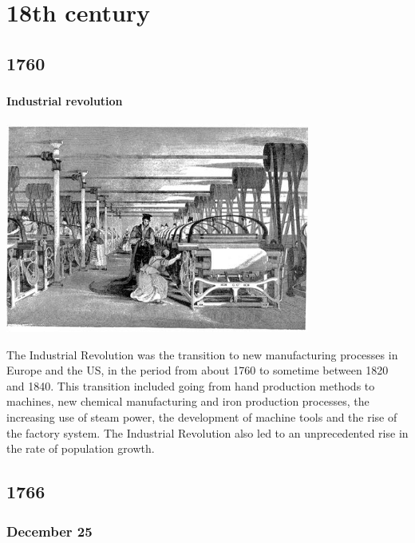 \documentclass[11pt]{report}
\begin{document}
							
\part{18th century}
\chapter{1760}
\section{}
\subsection{Industrial revolution}
\vspace{2mm}\begin{center}\includegraphics[width=10cm]{./img/industrevolution.jpg}\end{center}
The Industrial Revolution was the transition to new manufacturing processes in Europe and the US, in the period from about 1760 to sometime between 1820 and 1840. This transition included going from hand production methods to machines, new chemical manufacturing and iron production processes, the increasing use of steam power, the development of machine tools and the rise of the factory system. The Industrial Revolution also led to an unprecedented rise in the rate of population growth.

\chapter{1766}
\section{December 25}
\end{document}

